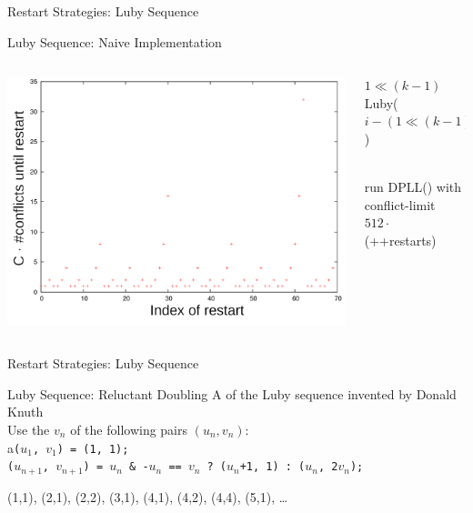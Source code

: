 \documentclass[t]{sdqbeamer}
\begin{document}
\begin{frame}{Restart Strategies: Luby Sequence}
\begin{block}{Luby Sequence: Naive Implementation}
	\begin{columns}[T]
	\begin{column}{0.45\textwidth}
		\centering
		\includegraphics[width=\textwidth]{figures/l04/restart-luby-legend}
	\end{column}
	\begin{column}{0.5\textwidth}
	\begin{algorithm}[H]
		\DontPrintSemicolon
		\caption{Luby Sequence}
		\BlankLine
		 {
			 {
				\Return $1 \ll (k-1)$
			}
		}
		 {
			 {
				\Return Luby($i - (1 \ll (k-1)) + 1$)
			}
		}
	\end{algorithm}~\\[1ex]
	run DPLL() with conflict-limit $512 \cdot$ (++restarts)
	\end{column}
	\end{columns}
\end{block}
\end{frame}
		
\begin{frame}{Restart Strategies: Luby Sequence}
\begin{block}{Luby Sequence: Reluctant Doubling}
A  of the Luby sequence invented by Donald Knuth\\[1ex]
Use the $v_n$ of the following pairs $(u_n, v_n)$:\\[1ex]
a\texttt{($u_1$, $v_1$) = (1, 1);}\\
\texttt{($u_{n+1}$, $v_{n+1}$) = $u_n$ \& -$u_n$ == $v_n$\ ?\ ($u_n$+1, 1) :\ ($u_n$, 2$v_n$);}
\end{block}
\begin{example}
(1,1), (2,1), (2,2), (3,1), (4,1), (4,2), (4,4), (5,1), \ldots
\end{example}
\end{frame}
		
\end{document}
